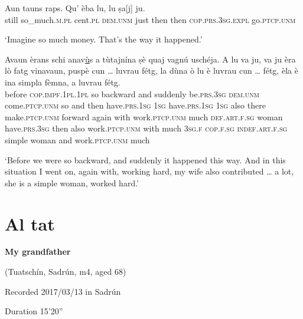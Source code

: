 \begin{linenumbers}
\gll    Aun tauns raps. Qu’ èba lu, lu ṣa[j] ju.\\
still so\_much.\textsc{m.pl} cent.\textsc{pl} \textsc{dem.unm} just then then \textsc{cop.prs.3sg.expl} go.\textsc{ptcp.unm}\\
\end{linenumbers}
\medskip
\glt `Imagine so much money. That’s the way it happened.'
\medskip

\begin{linenumbers}
\gll    Avaun èrans schi anav\underline{ù}s a tùtajnína ṣè quaj vagnú uschéja. A lu va ju, va ju èra lò fatg vinavaun, puspè cun … luvrau fétg, la dùna ò lu è luvrau cun … fétg, èla è ina simpla fèmna, a luvrau fétg.\\
before \textsc{cop.impf.1pl.1pl} so backward and suddenly be.\textsc{prs.3sg} \textsc{dem.unm} come.\textsc{ptcp.unm} so and then have.\textsc{prs.1sg} \textsc{1sg} have.\textsc{prs.1sg} \textsc{1sg} also there  make.\textsc{ptcp.unm} forward again with {} work.\textsc{ptcp.unm} much \textsc{def.art.f.sg} woman have.\textsc{prs.3sg} then also work.\textsc{ptcp.unm} with {} much \textsc{3sg.f} \textsc{cop.f.sg} \textsc{indef.art.f.sg} simple woman and work.\textsc{ptcp.unm} much\\
\end{linenumbers}
\medskip
\glt `Before we were so backward, and suddenly it happened this way. And in this situation I went on, again with, working hard, my wife also contributed … a lot, she is a simple woman, worked hard.'
\medskip

\section{Al tat}


\textbf{My grandfather}

\noindent
(Tuatschín, Sadrún, m4, aged 68)

\noindent
Recorded 2017/03/13 in Sadrún

\noindent
Duration 15'20''
\bigskip


